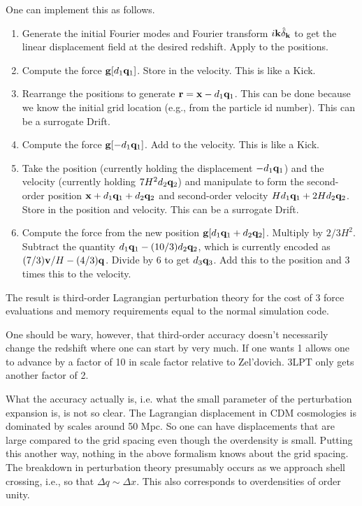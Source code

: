 \documentclass[11pt,preprint]{aastex}
\newcommand{\bfr}{\ensuremath{{\bf r}}}
\newcommand{\bfv}{\ensuremath{{\bf v}}}
\newcommand{\bfg}{\ensuremath{{\bf g}}}
\newcommand{\bfx}{\ensuremath{{\bf x}}}
\newcommand{\bfq}{\ensuremath{{\bf q}}}
\begin{document}
One can implement this as follows.

\begin{enumerate}
\item Generate the initial Fourier modes and Fourier transform 
$i{\bf k} \hat\delta_{\bf k}$ to get the linear displacement field
at the desired redshift.  Apply to the positions.

\item Compute the force $\bfg[d_1 \bfq_1]$.  Store in the velocity.
This is like a Kick.

\item Rearrange the positions to generate $\bfr = \bfx-d_1 \bfq_1$.  This 
can be done because we know the initial grid location (e.g., from the particle
id number).  This can be a surrogate Drift.

\item Compute the force $\bfg[-d_1 \bfq_1]$.  Add to the velocity.
This is like a Kick.

\item Take the position (currently holding the displacement $-d_1\bfq_1$)
and the velocity (currently holding $7H^2 d_2 \bfq_2$) and manipulate
to form the second-order position $\bfx + d_1\bfq_1 + d_2 \bfq_2$ and
second-order velocity $H d_1 \bfq_1 + 2H d_2 \bfq_2$.  Store in the 
position and velocity.  This can be a surrogate Drift.

\item Compute the force from the new position $\bfg[d_1\bfq_1+ d_2\bfq_2]$.
Multiply by $2/3H^2$.
Subtract the quantity $d_1 \bfq_1 - (10/3) d_2 \bfq_2$, which is currently
encoded as $(7/3)\bfv/H - (4/3)\bfq$.  
Divide by 6 to get $d_3 \bfq_3$.
Add this to the position and 3 times this to the velocity.

\end{enumerate}

The result is third-order Lagrangian perturbation theory for the cost of 
3 force evaluations and memory requirements equal to the normal simulation
code.

One should be wary, however, that third-order accuracy doesn't
necessarily change the redshift where one can start by very much.
If one wants 1%
allows one to advance by a factor of 10 in scale factor relative
to Zel'dovich.  3LPT only gets another factor of 2.

What the accuracy actually is, i.e. what the small parameter of the 
perturbation expansion is, is not so clear.  The Lagrangian displacement
in CDM cosmologies is dominated by scales around 50 Mpc.  So one can have
displacements that are large compared to the grid spacing even though the
overdensity is small.  Putting this another way, nothing in the above
formalism knows about the grid spacing.  The breakdown in perturbation
theory presumably occurs as we approach shell crossing, i.e., so that 
$\Delta q \sim \Delta x$.  This also corresponds to overdensities of order
unity.
\end{document}
